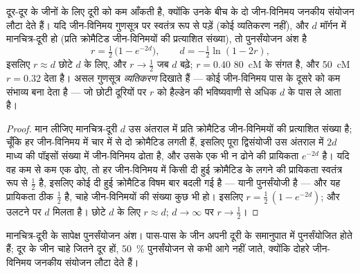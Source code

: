 \begin{theorem}[हैल्डेन का मानचित्रण फलन]\label{thm:b2:meiosis-heredity:haldane}
दूर-दूर के जीनों के लिए  दूरी को कम आँकती है,
क्योंकि उनके बीच के दो जीन-विनिमय जनकीय संयोजन लौटा देते हैं। यदि
जीन-विनिमय गुणसूत्र पर स्वतंत्र रूप से पड़ें (कोई व्यतिकरण नहीं), और
$d$ मॉर्गन में मानचित्र-दूरी हो (प्रति क्रोमैटिड जीन-विनिमयों की
प्रत्याशित संख्या), तो पुनर्संयोजन अंश है
\[
r = \tfrac12\,\bigl(1 - e^{-2d}\bigr), \qquad d = -\tfrac12\ln(1 - 2r),
\]
इसलिए $r \approx d$ छोटे $d$ के लिए, और $r \to \tfrac12$ जब $d$ बढ़े;
$r = 0.40$ \qty{80}{cM} के संगत है, और \qty{50}{cM}
$r = 0.32$ देता है। असल गुणसूत्र \emph{व्यतिकरण} दिखाते हैं --- कोई
जीन-विनिमय पास के दूसरे को कम संभाव्य बना देता है --- जो छोटी दूरियों पर
$r$ को हैल्डेन की भविष्यवाणी से अधिक $d$ के पास ले आता है।
\end{theorem}
\begin{proof}
मान लीजिए मानचित्र-दूरी $d$ उस अंतराल में प्रति क्रोमैटिड जीन-विनिमयों
की प्रत्याशित संख्या है; चूँकि हर जीन-विनिमय में चार में से दो
क्रोमैटिड लगती हैं, इसलिए पूरा द्विसंयोजी उस अंतराल में $2d$ माध्य की
पॉइसों संख्या में जीन-विनिमय ढोता है, और उसके एक भी न ढोने की प्रायिकता
$e^{-2d}$ है। यदि वह कम से कम एक ढोए, तो हर जीन-विनिमय में
किसी दी हुई क्रोमैटिड के लगने की प्रायिकता स्वतंत्र रूप से
$\tfrac12$ है, इसलिए कोई दी हुई क्रोमैटिड विषम बार बदली गई है --- यानी
पुनर्संयोजी है --- और यह प्रायिकता ठीक $\tfrac12$ है, चाहे
जीन-विनिमयों की संख्या कुछ भी हो। इसलिए $r = \tfrac12\,(1 -
e^{-2d})$; और उलटने पर $d$ मिलता है। छोटे $d$ के लिए $r \approx d$;
$d \to \infty$ पर $r \to \tfrac12$।
\end{proof}

\begin{omfigure}

{\small मानचित्र-दूरी के सापेक्ष पुनर्संयोजन अंश। पास-पास के जीन अपनी
दूरी के समानुपात में पुनर्संयोजित होते हैं; दूर के जीन चाहे जितने दूर
हों, \qty{50}{\%} पुनर्संयोजन से कभी आगे नहीं जाते, क्योंकि दोहरे
जीन-विनिमय जनकीय संयोजन लौटा देते हैं।}
\end{omfigure}

